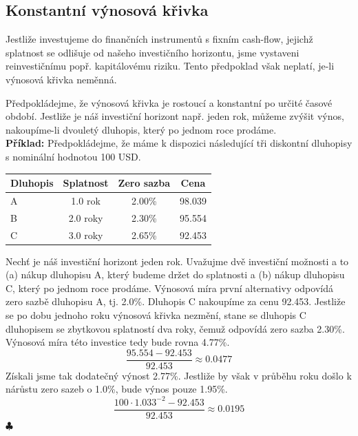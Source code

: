 \documentclass[a4paper]{book}
\begin{document}
\subsection{Konstantní výnosová křivka}

Jestliže investujeme do finančních instrumentů s fixním cash-flow, jejichž splatnost se odlišuje od našeho investičního horizontu, jsme vystaveni reinvestičnímu popř. kapitálovému riziku. Tento předpoklad však neplatí, je-li výnosová křivka neměnná.

Předpokládejme, že výnosová křivka je rostoucí a konstantní po určité časové období. Jestliže je náš investiční horizont např. jeden rok, můžeme zvýšit výnos, nakoupíme-li dvouletý dluhopis, který po jednom roce prodáme.\\

\noindent \textbf{Příklad:} Předpokládejme, že máme k dispozici následující tři diskontní dluhopisy s nominální hodnotou 100 USD.
\begin{center}
\begin{tabular}{l c c c}
\textbf{Dluhopis} & \textbf{Splatnost}  & \textbf{Zero sazba} & \textbf{Cena}\\
\hline
A & 1.0 rok  & 2.00\% & 98.039 \\
B & 2.0 roky & 2.30\% & 95.554 \\
C & 3.0 roky & 2.65\% & 92.453 \\
\end{tabular}
\end{center}
Nechť je náš investiční horizont jeden rok. Uvažujme dvě investiční možnosti a to (a) nákup dluhopisu A, který budeme držet do splatnosti a (b) nákup dluhopisu C, který po jednom roce prodáme. Výnosová míra první alternativy odpovídá zero sazbě dluhopisu A, tj. 2.0\%. Dluhopis C nakoupíme za cenu 92.453. Jestliže se po dobu jednoho roku výnosová křivka nezmění, stane se dluhopis C dluhopisem se zbytkovou splatností dva roky, čemuž odpovídá zero sazba 2.30\%. Výnosová míra této investice tedy bude rovna 4.77\%.
\begin{equation*}
\frac{95.554 - 92.453}{92.453} \approx 0.0477
\end{equation*}
Získali jsme tak dodatečný výnost 2.77\%. Jestliže by však v průběhu roku došlo k nárůstu zero sazeb o 1.0\%, bude výnos pouze 1.95\%.
\begin{equation*}
\frac{100 \cdot 1.033^{-2} - 92.453}{92.453} \approx 0.0195
\end{equation*}
$\clubsuit$\\
\end{document}
